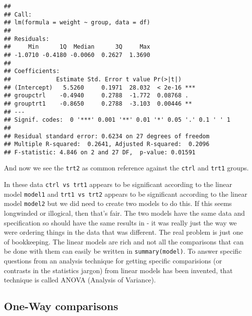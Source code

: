 \documentclass[]{book}
\newenvironment{Shaded}{\begin{snugshade}}{\end{snugshade}}
\newcommand{\DataTypeTok}[1]{\textcolor[rgb]{0.13,0.29,0.53}{#1}}
\newcommand{\KeywordTok}[1]{\textcolor[rgb]{0.13,0.29,0.53}{\textbf{#1}}}
\newcommand{\NormalTok}[1]{#1}
\newcommand{\OperatorTok}[1]{\textcolor[rgb]{0.81,0.36,0.00}{\textbf{#1}}}
\newcommand{\StringTok}[1]{\textcolor[rgb]{0.31,0.60,0.02}{#1}}
\begin{document}
\begin{Shaded}
\end{Shaded}

\begin{verbatim}
## 
## Call:
## lm(formula = weight ~ group, data = df)
## 
## Residuals:
##     Min      1Q  Median      3Q     Max 
## -1.0710 -0.4180 -0.0060  0.2627  1.3690 
## 
## Coefficients:
##             Estimate Std. Error t value Pr(>|t|)    
## (Intercept)   5.5260     0.1971  28.032  < 2e-16 ***
## groupctrl    -0.4940     0.2788  -1.772  0.08768 .  
## grouptrt1    -0.8650     0.2788  -3.103  0.00446 ** 
## ---
## Signif. codes:  0 '***' 0.001 '**' 0.01 '*' 0.05 '.' 0.1 ' ' 1
## 
## Residual standard error: 0.6234 on 27 degrees of freedom
## Multiple R-squared:  0.2641, Adjusted R-squared:  0.2096 
## F-statistic: 4.846 on 2 and 27 DF,  p-value: 0.01591
\end{verbatim}

And now we see the \texttt{trt2} as common reference against the \texttt{ctrl} and \texttt{trt1} groups.

In these data \texttt{ctrl\ vs\ trt1} appears to be significant according to the linear model \texttt{model1} and \texttt{trt1\ vs\ trt2} appears to be significant according to the linear model \texttt{model2} but we did need to create two models to do this. If this seems longwinded or illogical, then that's fair. The two models have the same data and specification so should have the same results in - it was really just the way we were ordering things in the data that was different. The real problem is just one of bookkeeping. The linear models are rich and not all the comparisons that can be done with them can easily be written in \texttt{summary(model)}. To answer specific questions from an analysis technique for getting specific comparisions (or contrasts in the statistics jargon) from linear models has been invented, that technique is called ANOVA (Analysis of Variance).

\hypertarget{one-way-comparisons}{%
\subsection{One-Way comparisons}\label{one-way-comparisons}}
\end{document}
